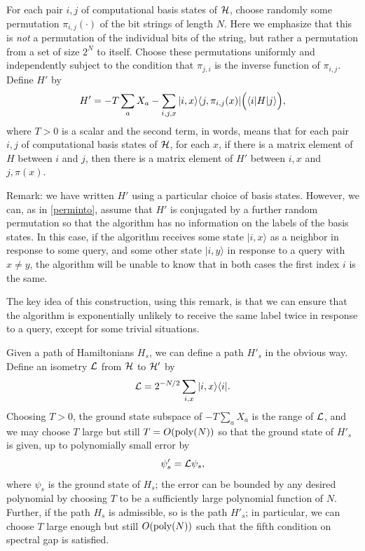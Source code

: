 \documentclass[letterpaper,onecolumn]{quantumarticle}
\newcommand{\be}{\begin{equation}}
\newcommand{\ee}{\end{equation}}
\newcommand{\poly}{{\rm poly}}
\newcommand{\cH}{{\cal H}}
\newcommand{\isL}{{\cal L}}
\begin{document}
For each pair $i,j$ of computational basis states of $\cH$, choose randomly some permutation $\pi_{i,j}(\cdot)$ of the bit strings of length $N$.
Here we emphasize that this is {\it not} a permutation of the individual bits of the string, but rather a permutation from a set of size $2^N$ to itself.
Choose these permutations uniformly and independently subject to the condition that $\pi_{j,i}$ is the inverse function of $\pi_{i,j}$.
Define $H'$ by
\be
H'=-T \sum_a X_a -\sum_{i,j,x} |i,x\rangle \langle j,\pi_{i,j}(x)| \Bigl( \langle i | H | j \rangle \Bigr),
\ee
where $T>0$ is a scalar and the second term, in words, means that for each pair $i,j$ of computational basis states of $\cH$, for each $x$, if there is a matrix element of $H$ between $i$ and $j$, then there is a matrix element of $H'$ between $i,x$ and $j,\pi(x)$.


Remark: we have written $H'$ using a particular choice of basis states.  However, we can, as in \cref{perminto}, assume that $H'$ is conjugated by a further random permutation so that the algorithm has no information on the labels of the basis states.
In this case, if the algorithm receives some state $|i,x\rangle$ as a neighbor in response to some query, and some other state $|i,y\rangle$ in response to a query with $x\neq y$, the algorithm will be unable to know that in both cases the first index $i$ is the same.

The key idea of this construction, using this remark, is that we can ensure that the algorithm is exponentially unlikely to receive the same label twice in response to a query, except for some trivial situations.

Given a path of Hamiltonians $H_s$, we can define a path $H'_s$ in the obvious way.
Define an isometry $\isL$ from $\cH$ to $\cH'$ by
$$\isL=2^{-N/2} \sum_{i,x} |i,x\rangle \langle i|.$$
Choosing $T>0$, the ground state subspace of $-T\sum_a X_a$ is the range of $\isL$, and
we may choose $T$ large but still $T=O(\poly(N))$ so that
the ground state of $H'_s$ is given, up to polynomially small error by
$$\psi'_s=\isL \psi_s,$$
where $\psi_s$ is the ground state of $H_s$;
the error can be bounded by any desired polynomial by choosing $T$ to be a sufficiently large polynomial function of $N$.
Further,
 if the path $H_s$ is admissible, so is the path $H'_s$; in particular, we can choose $T$ large enough but still $O(\poly(N))$ such that the fifth condition on spectral gap is satisfied.
\end{document}
